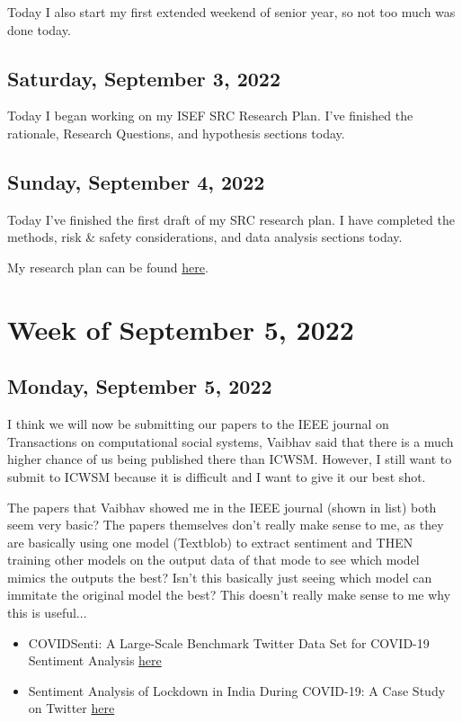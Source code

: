 \documentclass[11pt,letterpaper]{article}
\begin{document}
Today I also start my first extended weekend of senior year, so not too much was done today.

\subsection{Saturday, September 3, 2022}
Today I began working on my ISEF SRC Research Plan. I've finished the rationale, Research Questions, and hypothesis sections today.

\subsection{Sunday, September 4, 2022}
Today I've finished the first draft of my SRC research plan. I have completed the methods, risk & safety considerations, and data analysis sections today.

My research plan can be found \href{https://docs.google.com/document/d/1Q7jFEalh9ScSkIwjcvOFlRqDYMJcEpE9-Bwyo190OLA/edit#}{here}.
\section{Week of September 5, 2022}
\subsection{Monday, September 5, 2022}
I think we will now be submitting our papers to the IEEE journal on Transactions on computational social systems, Vaibhav said that there is a much higher chance of us being published there than ICWSM. However, I still want to submit to ICWSM because it is difficult and I want to give it our best shot.

The papers that Vaibhav showed me in the IEEE journal (shown in list) both seem very basic? The papers themselves don't really make sense to me, as they are basically using one model (Textblob) to extract sentiment and THEN training other models on the output data of that mode to see which model mimics the outputs the best? Isn't this basically just seeing which model can immitate the original model the best? This doesn't really make sense to me why this is useful...
\begin{itemize}
    \item COVIDSenti: A Large-Scale Benchmark Twitter Data Set for COVID-19 Sentiment Analysis \href{https://ieeexplore.ieee.org/stamp/stamp.jsp?tp=&arnumber=9340540}{here}
    \item Sentiment Analysis of Lockdown in India During COVID-19: A Case Study on Twitter \href{https://ieeexplore.ieee.org/stamp/stamp.jsp?tp=&arnumber=9301194}{here}
\end{itemize}
\end{document}
